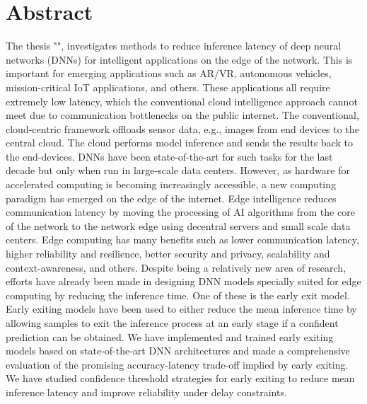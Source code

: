 
\hypertarget{abstract}{%
	\chapter*{Abstract}\label{sec:abstract}}
\begin{justify}
	\begin{small}
		{\textcolor{caption-color}{The thesis "\thetitle", investigates methods to reduce inference latency of deep neural networks (DNNs) for intelligent applications on the edge of the network. This is important for emerging applications such as AR/VR, autonomous vehicles, mission-critical IoT applications, and others. These applications all require extremely low latency, which the conventional cloud intelligence approach cannot meet due to communication bottlenecks on the public internet. \newline
				The conventional, cloud-centric framework offloads sensor data, e.g., images from end devices to the central cloud. The cloud performs model inference and sends the results back to the end-devices. DNNs have been state-of-the-art for such tasks for the last decade but only when run in large-scale data centers. However, as hardware for accelerated computing is becoming increasingly accessible, a new computing paradigm has emerged on the edge of the internet.
				\newline Edge intelligence reduces communication latency by moving the processing of AI algorithms from the core of the network to the network edge using decentral servers and small scale data centers. Edge computing has many benefits such as lower communication latency, higher reliability and resilience, better security and privacy, scalability and context-awareness, and others. Despite being a relatively new area of research, efforts have already been made in designing DNN models specially suited for edge computing by reducing the inference time. One of these is the early exit model. 
				\newline Early exiting models have been used to either reduce the mean inference time by allowing samples to exit the inference process at an early stage if a confident prediction can be obtained. We have implemented and trained early exiting models based on state-of-the-art DNN architectures and made a comprehensive evaluation of the promising accuracy-latency trade-off implied by early exiting. We have studied confidence threshold strategies for early exiting to reduce mean inference latency and improve reliability under delay constraints.
				\newline
}}
\end{small}
\end{justify}
